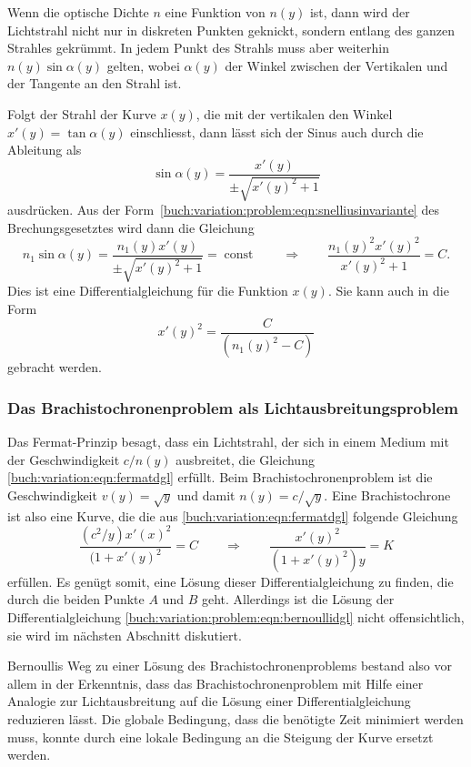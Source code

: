 Wenn die optische Dichte $n$ eine Funktion von $n(y)$ ist, dann
wird der Lichtstrahl nicht nur in diskreten Punkten geknickt, sondern
entlang des ganzen Strahles gekrümmt.
In jedem Punkt des Strahls muss aber weiterhin $n(y)\sin\alpha(y)$
gelten, wobei $\alpha(y)$ der Winkel zwischen der Vertikalen und
der Tangente an den Strahl ist.

Folgt der Strahl der Kurve $x(y)$, die mit der vertikalen den Winkel
$x'(y) = \tan\alpha(y)$ einschliesst, dann lässt sich der Sinus
auch durch die Ableitung als
\[
\sin\alpha(y)
=
\frac{x'(y)}{\pm\!\sqrt{x'(y)^2+1}}
\]
ausdrücken.
Aus der Form~\eqref{buch:variation:problem:eqn:snelliusinvariante}
des Brechungsgesetztes wird dann die Gleichung
\begin{equation}
n_1\sin\alpha(y)
=
\frac{n_1(y)x'(y)}{\pm\!\sqrt{x'(y)^2+1}}
=
\operatorname{const}
\qquad\Rightarrow\qquad
\frac{n_1(y)^2x'(y)^2}{x'(y)^2+1}=C.
\label{buch:variation:eqn:fermatdgl}
\end{equation}
Dies ist eine Differentialgleichung für die Funktion $x(y)$.
Sie kann auch in die Form
\[
x'(y)^2
=
\frac{C}{(n_1(y)^2-C)}
\]
gebracht werden.

%
%
\subsubsection{Das Brachistochronenproblem als Lichtausbreitungsproblem}
Das Fermat-Prinzip besagt, dass ein Lichtstrahl, der sich in einem Medium
mit der Geschwindigkeit $c/n(y)$ ausbreitet, die Gleichung 
\eqref{buch:variation:eqn:fermatdgl} erfüllt.
Beim Brachistochronenproblem ist die Geschwindigkeit $v(y)=\!\sqrt{y}$ und 
damit $n(y) = c/\!\sqrt{y}$.
Eine Brachistochrone ist also eine Kurve, die die aus
\eqref{buch:variation:eqn:fermatdgl} folgende Gleichung
\begin{equation}
\frac{(c^2/y) x'(x)^2}{(1+x'(y)^2}
=
C
\qquad\Rightarrow\qquad
\frac{x'(y)^2}{(1+x'(y)^2)y}
=
K
\label{buch:variation:problem:eqn:bernoullidgl}
\end{equation}
erfüllen.
Es genügt somit, eine Lösung dieser Differentialgleichung zu finden,
die durch die beiden Punkte $A$ und $B$ geht.
Allerdings ist die Lösung der Differentialgleichung
\eqref{buch:variation:problem:eqn:bernoullidgl}
nicht offensichtlich, sie wird im nächsten Abschnitt diskutiert.

Bernoullis Weg zu einer Lösung des Brachistochronenproblems bestand
also vor allem in der Erkenntnis, dass das Brachistochronenproblem mit
Hilfe einer Analogie zur Lichtausbreitung auf die Lösung einer
Differentialgleichung reduzieren lässt.
Die globale Bedingung, dass die benötigte Zeit minimiert werden muss,
konnte durch eine lokale Bedingung an die Steigung der Kurve ersetzt
werden.

